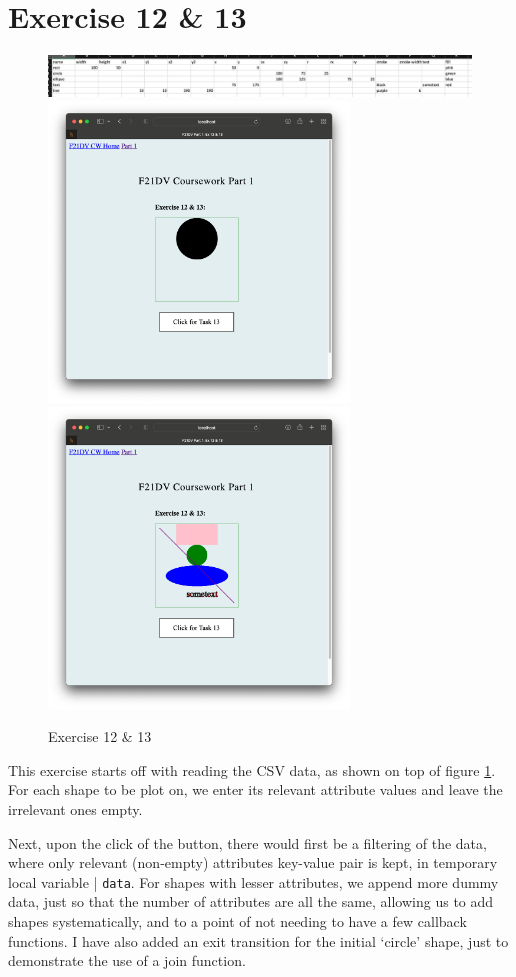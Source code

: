 \documentclass{scrreprt}
\begin{document}
\section{Exercise 12 \& 13}
\begin{figure}[!ht]
    \centering
    \includegraphics[width = \textwidth]{images/ex12_3.png}
    \includegraphics[width = 8cm]{images/ex12_1.png}
    \includegraphics[width = 8cm]{images/ex12_2.png}
    \label{fig:ex12}
    \caption{Exercise 12 \& 13}
\end{figure}
\FloatBarrier

This exercise starts off with reading the CSV data, as shown on top of figure \ref{fig:ex12}. For each
shape to be plot on, we enter its relevant attribute values and leave the irrelevant ones empty.\\
\par Next, upon the click of the button, there would first be a filtering of the data, where only
relevant (non-empty) attributes key-value pair is kept, in temporary local variable | \verb|data|. For 
shapes with lesser attributes, we append more dummy data, just so that the number of attributes are all
the same, allowing us to add shapes systematically, and to a point of not needing to have a few callback
functions. I have also added an exit transition for the initial `circle' shape, just to demonstrate the
use of a join function.
\end{document}
